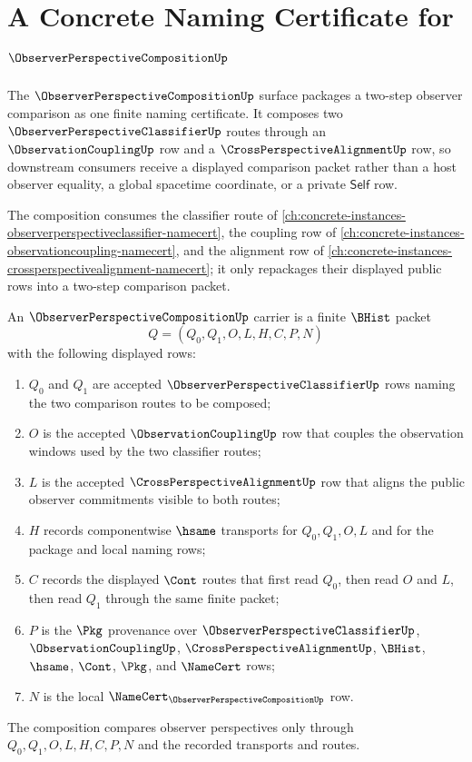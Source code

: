 \chapter{A Concrete Naming Certificate for $\ObserverPerspectiveCompositionUp$}
\label{ch:concrete-instances-observer-perspective-composition-namecert}

The $\ObserverPerspectiveCompositionUp$ surface packages a two-step observer comparison as one finite naming certificate. It composes two $\ObserverPerspectiveClassifierUp$ routes through an $\ObservationCouplingUp$ row and a $\CrossPerspectiveAlignmentUp$ row, so downstream consumers receive a displayed comparison packet rather than a host observer equality, a global spacetime coordinate, or a private $\mathsf{Self}$ row.

The composition consumes the classifier route of \autoref{ch:concrete-instances-observerperspectiveclassifier-namecert}, the coupling row of \autoref{ch:concrete-instances-observationcoupling-namecert}, and the alignment row of \autoref{ch:concrete-instances-crossperspectivealignment-namecert}; it only repackages their displayed public rows into a two-step comparison packet.

\begin{definition}
\label{def:observer-perspective-composition-carrier}
An $\ObserverPerspectiveCompositionUp$ carrier is a finite $\BHist$ packet
$$
Q=(Q_0,Q_1,O,L,H,C,P,N)
$$
with the following displayed rows:
\begin{enumerate}
\item $Q_0$ and $Q_1$ are accepted $\ObserverPerspectiveClassifierUp$ rows naming the two comparison routes to be composed;
\item $O$ is the accepted $\ObservationCouplingUp$ row that couples the observation windows used by the two classifier routes;
\item $L$ is the accepted $\CrossPerspectiveAlignmentUp$ row that aligns the public observer commitments visible to both routes;
\item $H$ records componentwise $\hsame$ transports for $Q_0,Q_1,O,L$ and for the package and local naming rows;
\item $C$ records the displayed $\Cont$ routes that first read $Q_0$, then read $O$ and $L$, then read $Q_1$ through the same finite packet;
\item $P$ is the $\Pkg$ provenance over $\ObserverPerspectiveClassifierUp$, $\ObservationCouplingUp$, $\CrossPerspectiveAlignmentUp$, $\BHist$, $\hsame$, $\Cont$, $\Pkg$, and $\NameCert$ rows;
\item $N$ is the local $\NameCert_{\ObserverPerspectiveCompositionUp}$ row.
\end{enumerate}
The composition compares observer perspectives only through $Q_0,Q_1,O,L,H,C,P,N$ and the recorded transports and routes.
\end{definition}

